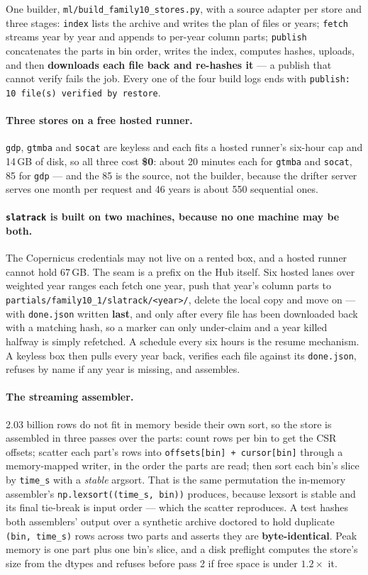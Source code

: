 \documentclass[10pt]{article}
\newcommand{\code}[1]{\texttt{#1}}
\begin{document}
One builder, \code{ml/build\_family10\_stores.py}, with a source adapter per
store and three stages: \code{index} lists the archive and writes the plan of
files or years; \code{fetch} streams year by year and appends to per-year column
parts; \code{publish} concatenates the parts in bin order, writes the index,
computes hashes, uploads, and then \textbf{downloads each file back and
re-hashes it} --- a publish that cannot verify fails the job. Every one of the
four build logs ends with \code{publish: 10 file(s) verified by restore}.

\paragraph{Three stores on a free hosted runner.} \code{gdp}, \code{gtmba} and
\code{socat} are keyless and each fits a hosted runner's six-hour cap and
14\,GB of disk, so all three cost \textbf{\$0}: about 20 minutes each for
\code{gtmba} and \code{socat}, 85 for \code{gdp} --- and the 85 is the source,
not the builder, because the drifter server serves one month per request and 46
years is about 550 sequential ones.

\paragraph{\code{slatrack} is built on two machines, because no one machine may
be both.} The Copernicus credentials may not live on a rented box, and a hosted
runner cannot hold 67\,GB. The seam is a prefix on the Hub itself. Six hosted
lanes over weighted year ranges each fetch one year, push that year's column
parts to \code{partials/family10\_1/slatrack/<year>/}, delete the local copy and
move on --- with \code{done.json} written \textbf{last}, and only after every
file has been downloaded back with a matching hash, so a marker can only
under-claim and a year killed halfway is simply refetched. A schedule every six
hours is the resume mechanism. A keyless box then pulls every year back,
verifies each file against its \code{done.json}, refuses by name if any year is
missing, and assembles.

\paragraph{The streaming assembler.} 2.03 billion rows do not fit in memory
beside their own sort, so the store is assembled in three passes over the
parts: count rows per bin to get the CSR offsets;
scatter each part's rows into \code{offsets[bin] + cursor[bin]} through a
memory-mapped writer, in the order the parts are read; then sort each bin's
slice by \code{time\_s} with a \emph{stable} argsort. That is the same
permutation the in-memory assembler's \code{np.lexsort((time\_s, bin))}
produces, because lexsort is stable and its final tie-break is input order ---
which the scatter reproduces. A test hashes both assemblers' output over a
synthetic archive doctored to hold duplicate \code{(bin, time\_s)} rows
across two parts and asserts they are \textbf{byte-identical}. Peak memory is
one part plus one bin's slice, and a disk preflight computes the store's size
from the dtypes and refuses before pass 2 if free space is under $1.2\times$ it.
\end{document}
